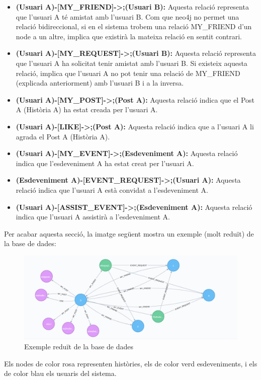 \documentclass[11pt,catalan,listoffigures,listoftables]{tfgetsinf}
\begin{document}
\begin{itemize}
\item \textbf{(Usuari A)-[MY\_FRIEND]->;(Usuari B):} Aquesta relació representa que l'usuari A té amistat amb l'usuari B. Com que neo4j no permet una relació bidireccional, si en el sistema trobem una relació MY\_FRIEND d'un node a un altre, implica que existirà la mateixa relació en sentit contrari.
\item \textbf{(Usuari A)-[MY\_REQUEST]->;(Usuari B):} Aquesta relació representa que l'usuari A ha solicitat tenir amistat amb l'usuari B. Si existeix aquesta relació, implica que l'usuari A no pot tenir una relació de MY\_FRIEND (explicada anteriorment) amb l'usuari B i a la inversa.
\item \textbf{(Usuari A)-[MY\_POST]->;(Post A):} Aquesta relació indica que el Post A (Història A) ha estat creada per l'usuari A.
\item \textbf{(Usuari A)-[LIKE]->;(Post A):} Aquesta relació indica que a l'usuari A li agrada el Post A (Història A).
\item \textbf{(Usuari A)-[MY\_EVENT]->;(Esdeveniment A):} Aquesta relació indica que l'esdeveniment A ha estat creat per l'usuari A.
\item \textbf{(Esdeveniment A)-[EVENT\_REQUEST]->;(Usuari A):} Aquesta relació indica que l'usuari A està convidat a l'esdeveniment A.
\item \textbf{(Usuari A)-[ASSIST\_EVENT]->;(Esdeveniment A):} Aquesta relació indica que l'usuari A assistirà a l'esdeveniment A.
\end{itemize}

Per acabar aquesta secció, la imatge següent mostra un exemple (molt reduït) de la base de dades:

\begin{figure}[H]
\includegraphics[width=15cm]{images/image11}
\centering
\caption[Figura 4.7]{Exemple reduït de la base de dades}
\centering
\end{figure}
Els nodes de color rosa representen històries, els de color verd esdeveniments, i els de color blau els usuaris del sistema.
\end{document}
